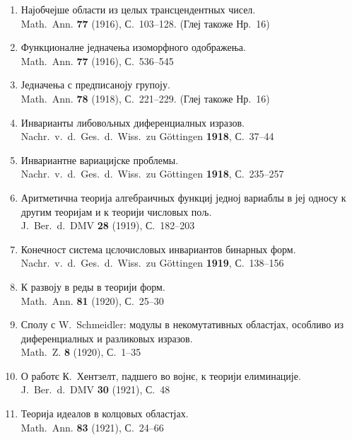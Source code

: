 \documentclass[11pt]{article}
\newcommand{\foreign}[1]{#1}
\begin{document}
\begin{enumerate}[label={\small\arabic*.},leftmargin=2em,itemsep=0.3em]
\item Најобчејше области из целых трансцендентных чисел.\\
\foreign{Math.\ Ann.} \textbf{77} (1916), С.~103--128. (Глеј такоже Нр.~16)

\item Функционалне једначења изоморфного одображења.\\
\foreign{Math.\ Ann.} \textbf{77} (1916), С.~536--545

\item Једначења с предписаноју групоју.\\
\foreign{Math.\ Ann.} \textbf{78} (1918), С.~221--229. (Глеј такоже Нр.~16)

\item Инварианты либовољных диференциалных изразов.\\
\foreign{Nachr.\ v.\ d.\ Ges.\ d.\ Wiss.\ zu Göttingen} \textbf{1918}, С.~37--44

\item Инвариантне вариацијске проблемы.\\
\foreign{Nachr.\ v.\ d.\ Ges.\ d.\ Wiss.\ zu Göttingen} \textbf{1918}, С.~235--257

\item Аритметична теорија алгебраичных функциј једној вариаблы в јеј односу к другим теоријам и к теорији числовых пољ.\\
\foreign{J.\ Ber.\ d.\ DMV} \textbf{28} (1919), С.~182--203

\item Конечност система цєлочисловых инвариантов бинарных форм.\\
\foreign{Nachr.\ v.\ d.\ Ges.\ d.\ Wiss.\ zu Göttingen} \textbf{1919}, С.~138--156

\item К развоју в реды в теорији форм.\\
\foreign{Math.\ Ann.} \textbf{81} (1920), С.~25--30

\item Сполу с \foreign{W.\ Schmeidler}: модулы в некомутативных областјах, особливо из диференциалных и разликовых изразов.\\
\foreign{Math.\ Z.} \textbf{8} (1920), С.~1--35

\item О работє К.\ Хентзелт, падшего во војнє, к теорији елиминације.\\
\foreign{J.\ Ber.\ d.\ DMV} \textbf{30} (1921), С.~48

\item Теорија идеалов в колцовых областјах.\\
\foreign{Math.\ Ann.} \textbf{83} (1921), С.~24--66


\end{enumerate}
\end{document}
